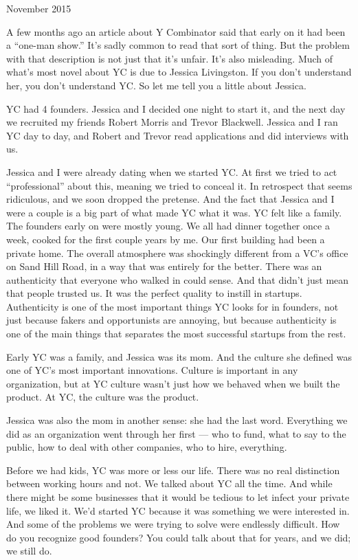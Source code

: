November 2015

A few months ago an article about Y Combinator said that early on it had
been a ``one-man show.'' It's sadly common to read that sort of thing.
But the problem with that description is not just that it's unfair. It's
also misleading. Much of what's most novel about YC is due to Jessica
Livingston. If you don't understand her, you don't understand YC. So let
me tell you a little about Jessica.

YC had 4 founders. Jessica and I decided one night to start it, and the
next day we recruited my friends Robert Morris and Trevor Blackwell.
Jessica and I ran YC day to day, and Robert and Trevor read applications
and did interviews with us.

Jessica and I were already dating when we started YC. At first we tried
to act ``professional'' about this, meaning we tried to conceal it. In
retrospect that seems ridiculous, and we soon dropped the pretense. And
the fact that Jessica and I were a couple is a big part of what made YC
what it was. YC felt like a family. The founders early on were mostly
young. We all had dinner together once a week, cooked for the first
couple years by me. Our first building had been a private home. The
overall atmosphere was shockingly different from a VC's office on Sand
Hill Road, in a way that was entirely for the better. There was an
authenticity that everyone who walked in could sense. And that didn't
just mean that people trusted us. It was the perfect quality to instill
in startups. Authenticity is one of the most important things YC looks
for in founders, not just because fakers and opportunists are annoying,
but because authenticity is one of the main things that separates the
most successful startups from the rest.

Early YC was a family, and Jessica was its mom. And the culture she
defined was one of YC's most important innovations. Culture is important
in any organization, but at YC culture wasn't just how we behaved when
we built the product. At YC, the culture was the product.

Jessica was also the mom in another sense: she had the last word.
Everything we did as an organization went through her first --- who to
fund, what to say to the public, how to deal with other companies, who
to hire, everything.

Before we had kids, YC was more or less our life. There was no real
distinction between working hours and not. We talked about YC all the
time. And while there might be some businesses that it would be tedious
to let infect your private life, we liked it. We'd started YC because it
was something we were interested in. And some of the problems we were
trying to solve were endlessly difficult. How do you recognize good
founders? You could talk about that for years, and we did; we still do.

